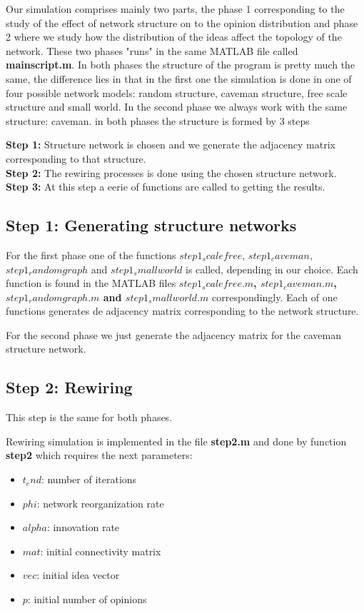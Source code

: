 Our simulation comprises mainly two parts, the phase 1 corresponding to the study  of the effect of network structure on to the opinion distribution and phase 2 where we study how the distribution of the ideas affect the topology of the network. These two phases "runs" in the same MATLAB file called \textbf{mainscript.m}. In both phases the structure of the program is pretty much the same, the difference lies in that in the first one the simulation is done in one of four possible network models: random structure, caveman structure, free scale structure and small world. In the second phase we always work with the same structure: caveman. 
in both phases the structure is formed by 3 steps

\textbf{Step 1:} Structure network is chosen and we generate the adjacency matrix corresponding to that structure.\\
\textbf{Step 2:} The rewiring processes is done using the chosen structure network.\\
\textbf{Step 3:} At this step a eerie of functions are called to getting the results.

\subsection{Step 1: Generating structure networks}

For the first phase one of the functions $step1_scalefree$, $step1_caveman$, $step1_randomgraph$ and $step1_smallworld$ is called, depending in our choice. Each function is found in the MATLAB files \textbf{$step1_scalefree.m$, $step1_caveman.m$, $step1_randomgraph.m$ and $step1_smallworld.m$ } correspondingly.  Each of one functions generates de adjacency matrix corresponding to the network structure. 

For the second phase we just generate the adjacency matrix for the caveman structure network.


\subsection{Step 2: Rewiring}

This step is the same for both phases.

Rewiring simulation is implemented in the file \textbf{step2.m} and done by function \textbf{step2} which requires the next parameters:
\begin{itemize}

\item $t_end$: number of iterations
 \item $phi$:  network reorganization rate
 \item $alpha$: innovation rate
\item $ mat$: initial connectivity matrix
\item  $vec$: initial idea vector
\item $p$: initial number of opinions
 \end{itemize}
 
